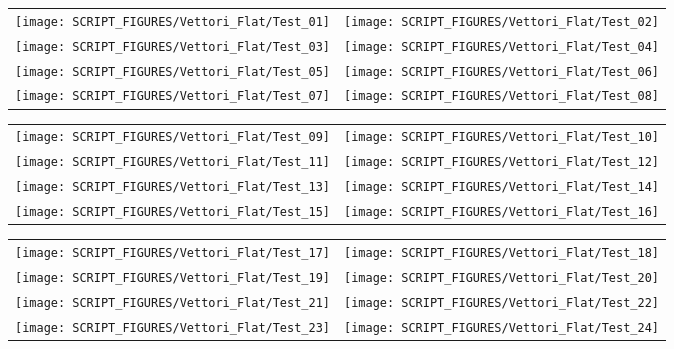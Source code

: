 \begin{figure}[!ht]
\begin{tabular*}{\textwidth}{l@{\extracolsep{\fill}}r}
\texttt{[image: SCRIPT\_FIGURES/Vettori\_Flat/Test\_01]} &
\texttt{[image: SCRIPT\_FIGURES/Vettori\_Flat/Test\_02]} \\
\texttt{[image: SCRIPT\_FIGURES/Vettori\_Flat/Test\_03]} &
\texttt{[image: SCRIPT\_FIGURES/Vettori\_Flat/Test\_04]} \\
\texttt{[image: SCRIPT\_FIGURES/Vettori\_Flat/Test\_05]} &
\texttt{[image: SCRIPT\_FIGURES/Vettori\_Flat/Test\_06]} \\
\texttt{[image: SCRIPT\_FIGURES/Vettori\_Flat/Test\_07]} &
\texttt{[image: SCRIPT\_FIGURES/Vettori\_Flat/Test\_08]} \\
\end{tabular*}
\label{Vettori_Plume_Temperature}
\end{figure}

\begin{figure}[!ht]
\begin{tabular*}{\textwidth}{l@{\extracolsep{\fill}}r}
\texttt{[image: SCRIPT\_FIGURES/Vettori\_Flat/Test\_09]} &
\texttt{[image: SCRIPT\_FIGURES/Vettori\_Flat/Test\_10]} \\
\texttt{[image: SCRIPT\_FIGURES/Vettori\_Flat/Test\_11]} &
\texttt{[image: SCRIPT\_FIGURES/Vettori\_Flat/Test\_12]} \\
\texttt{[image: SCRIPT\_FIGURES/Vettori\_Flat/Test\_13]} &
\texttt{[image: SCRIPT\_FIGURES/Vettori\_Flat/Test\_14]} \\
\texttt{[image: SCRIPT\_FIGURES/Vettori\_Flat/Test\_15]} &
\texttt{[image: SCRIPT\_FIGURES/Vettori\_Flat/Test\_16]} \\
\end{tabular*}
\label{Vettori_2}
\end{figure}

\begin{figure}[!ht]
\begin{tabular*}{\textwidth}{l@{\extracolsep{\fill}}r}
\texttt{[image: SCRIPT\_FIGURES/Vettori\_Flat/Test\_17]} &
\texttt{[image: SCRIPT\_FIGURES/Vettori\_Flat/Test\_18]} \\
\texttt{[image: SCRIPT\_FIGURES/Vettori\_Flat/Test\_19]} &
\texttt{[image: SCRIPT\_FIGURES/Vettori\_Flat/Test\_20]} \\
\texttt{[image: SCRIPT\_FIGURES/Vettori\_Flat/Test\_21]} &
\texttt{[image: SCRIPT\_FIGURES/Vettori\_Flat/Test\_22]} \\
\texttt{[image: SCRIPT\_FIGURES/Vettori\_Flat/Test\_23]} &
\texttt{[image: SCRIPT\_FIGURES/Vettori\_Flat/Test\_24]} \\
\end{tabular*}
\label{Vettori_3}
\end{figure}


